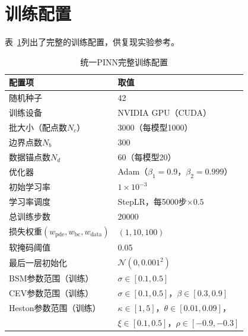 \section{训练配置}

表~\ref{tab:train_config}列出了完整的训练配置，供复现实验参考。

\begin{table}[htbp]
  \centering
  \caption{统一PINN完整训练配置}
  \label{tab:train_config}
  \begin{tabular}{ll}
    \hline
    配置项 & 取值 \\
    \hline
    随机种子 & 42 \\
    训练设备 & NVIDIA GPU（CUDA）\\
    批大小（配点数$N_c$） & 3000（每模型1000）\\
    边界点数$N_b$ & 300 \\
    数据锚点数$N_d$ & 60（每模型20）\\
    优化器 & Adam（$\beta_1=0.9$，$\beta_2=0.999$）\\
    初始学习率 & $1\times 10^{-3}$ \\
    学习率调度 & StepLR，每5000步$\times 0.5$ \\
    总训练步数 & 20000 \\
    损失权重$(w_\text{pde},w_\text{bc},w_\text{data})$ & $(1, 10, 100)$ \\
    软掩码阈值 & 0.05 \\
    最后一层初始化 & $\mathcal{N}(0, 0.001^2)$ \\
    BSM参数范围（训练） & $\sigma\in[0.1,0.5]$ \\
    CEV参数范围（训练） & $\sigma\in[0.1,0.5]$，$\beta\in[0.3,0.9]$ \\
    Heston参数范围（训练） & $\kappa\in[1,5]$，$\theta\in[0.01,0.09]$，\\
                           & $\xi\in[0.1,0.5]$，$\rho\in[-0.9,-0.3]$ \\
    \hline
  \end{tabular}
\end{table}
